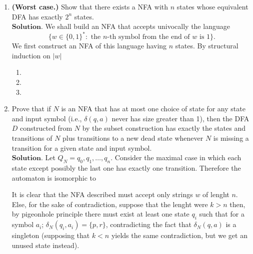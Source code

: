 \documentclass{article}
\theoremstyle{remark}
\begin{document}
\begin{enumerate}
    \item \textbf{(Worst case.)} Show that there exists a NFA with $n$ states whose equivalent DFA  
    has exactly $2^n$ states.\\
    $\textbf{Solution.}$
    We shall build an NFA that accepts univocally the language
    \[
    \{w\in \{0,1\}^*: \text{ the } n\text{-th} \text{ symbol from the end of } w \text{ is } 1\}.
    \]
    We first construct an NFA of this language having $n$ states.
    By structural induction on $\vert w \vert$
    \begin{enumerate}
        \item[\textbf{Basis.}]
        \item[\textbf{Hypothesis.}]
        \item[\textbf{Thesis.}]
    \end{enumerate}

    \item Prove that if \( N \) is an NFA that has at most one choice of state for any state and input symbol (i.e., \(\delta(q, a)\) never has size greater than 1), 
    then the DFA \( D \) constructed from \( N \) by the subset construction has exactly the states and transitions of \( N \) plus transitions to a new dead state whenever \( N \) is missing a transition
    for a given state and input symbol.\\
    $\textbf{Solution.}$
    Let $Q_N = q_0, q_1, \dots, q_n$.
    Consider the maximal case in which each state except possibly the last one has exactly one transition.
    Therefore the automaton is isomorphic to
    \begin{center} 
    \end{center}
    It is clear that the NFA described must accept only strings $w$ of lenght $n$.
    Else, for the sake of contradiction, suppose that the lenght were $k > n$ then, by pigeonhole principle
    there must exist at least one state $q_i$ such that for a symbol $a_i$; $\delta_{N}(q_{i},a_i) = \{p,r\}$, contradicting the fact 
    that $\delta_N(q,a)$ is a singleton (supposing that $k<n$ yields the same contradiction, but we get an unused state instead).


\end{enumerate}
\end{document}

